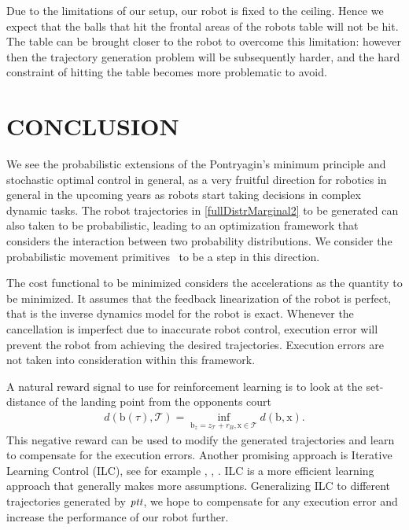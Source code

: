 \documentclass[letterpaper, 10 pt, conference]{ieeeconf}
\newcommand{\boldvec}[1]{\boldsymbol{\mathrm{#1}}}
\let\vec\boldvec
\newcommand{\alg}{\emph{ptt}} %
\newcommand{\ball}{\vec{b}} %
\newcommand{\ballRadius}{r_B}
\newcommand{\court}{\mathcal{T}} %
\newcommand{\landTime}{\tau} %
\begin{document}
Due to the limitations of our setup, our robot is fixed to the ceiling. Hence we expect that the balls that hit the frontal areas of the robots table will not be hit. The table can be brought closer to the robot to overcome this limitation: however then the trajectory generation problem will be subsequently harder, and the hard constraint of hitting the table becomes more problematic to avoid.


\section{CONCLUSION}\label{end}

We see the probabilistic extensions of the Pontryagin's minimum principle \cite{Liberzon11} and stochastic optimal control in general, as a very fruitful direction for robotics in general in the upcoming years as robots start taking decisions in complex dynamic tasks. The robot trajectories in \eqref{fullDistrMarginal2} to be generated can also taken to be probabilistic, leading to an optimization framework that considers the interaction between two probability distributions. We consider the probabilistic movement primitives~\cite{Paraschos13} to be a step in this direction.


The cost functional to be minimized considers the accelerations as the quantity to be minimized. It assumes that the feedback linearization of the robot is perfect, that is the inverse dynamics model for the robot is exact. Whenever the cancellation is imperfect due to inaccurate robot control, execution error will prevent the robot from achieving the desired trajectories. Execution errors are not taken into consideration within this framework. 

A natural reward signal to use for reinforcement learning is to look at the set-distance of the landing point from the opponents court
%
\begin{align}
d(\ball(\landTime),\court) = \inf_{\ball_z = z_{\court} + \ballRadius, \vec{x} \in \court} d(\ball,\vec{x}).
\end{align}
%
\noindent This negative reward can be used to modify the generated trajectories and learn to compensate for the execution errors. Another promising approach is Iterative Learning Control (ILC), see for example \cite{Bristow06}, \cite{Longman2000}, \cite{Koc15}. ILC is a more efficient learning approach that generally makes more assumptions. Generalizing ILC to different trajectories generated by $\alg$, we hope to compensate for any execution error and increase the performance of our robot further. 


%
%

\end{document}
